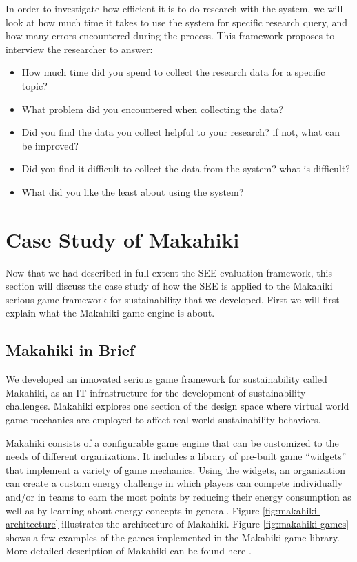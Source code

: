 \documentclass{sigchi}
\begin{document}
In order to investigate how efficient it is to do research with the system, we will look at how much time it takes to use the system for specific research query, and how many errors encountered during the process. This framework proposes to interview the researcher to answer:
\begin{itemize}
\item How much time did you spend to collect the research data for a specific topic?
\item What problem did you encountered when collecting the data?
\item Did you find the data you collect helpful to your research? if not, what can be improved?
\item Did you find it difficult to collect the data from the system? what is difficult?
\item What did you like the least about using the system?
\end{itemize}

\section{Case Study of Makahiki}
Now that we had described in full extent the SEE evaluation framework, this section will discuss the case study of how the SEE is applied to the Makahiki serious game framework for sustainability that we developed. First we will first explain what the Makahiki game engine is about.

\subsection{Makahiki in Brief}

We developed an innovated serious game framework for sustainability called Makahiki, as an IT infrastructure for the development of sustainability challenges. Makahiki explores one section of the design space
where virtual world game mechanics are employed to affect real world sustainability behaviors.

Makahiki consists of a configurable game engine that can be customized to the needs of different organizations.  It includes a library of pre-built game ``widgets'' that implement a variety of game mechanics.  Using the widgets, an organization can create a custom energy challenge in which players can compete individually and/or in teams to earn the most points by reducing their energy consumption as well as by learning about energy concepts in general. Figure \ref{fig:makahiki-architecture} illustrates the architecture of Makahiki. Figure \ref{fig:makahiki-games} shows a few examples of the games implemented in the Makahiki game library. More detailed description of Makahiki can be found here \cite{csdl2-12-06}.
\end{document}
